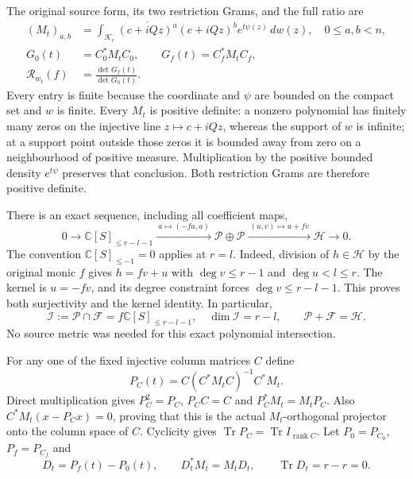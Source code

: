 The original source form, its two restriction Grams, and the full ratio are
\[
 \begin{split}
 (M_t)_{a,b}&=\int_{\mathcal K_\epsilon}
        \overline{(c+iQz)^a}(c+iQz)^b e^{t\psi(z)}\,dw(z),\quad 0\leq a,b<n,\\
 G_0(t)&=C_0^*M_tC_0,\qquad G_f(t)=C_f^*M_tC_f,\\
 \mathcal R_{w_t}(f)&=\frac{\det G_f(t)}{\det G_0(t)}.
 \end{split}
 \tag{CTR3}
\]
Every entry is finite because the coordinate and $\psi$ are bounded on
the compact set and $w$ is finite. Every $M_t$ is positive definite:
a nonzero polynomial has finitely many zeros on the injective line
$z\mapsto c+iQz$, whereas the support of $w$ is infinite; at a support
point outside those zeros it is bounded away from zero on a neighbourhood
of positive measure. Multiplication by the positive bounded density
$e^{t\psi}$ preserves that conclusion. Both restriction Grams are
therefore positive definite.

There is an exact sequence, including all coefficient maps,
\[
 0\longrightarrow\mathbb C[S]_{\leq r-l-1}
 \xrightarrow{\ a\mapsto(-fa,a)\ }
 \mathcal P\oplus\mathcal P
 \xrightarrow{\ (u,v)\mapsto u+fv\ }
 \mathcal H\longrightarrow0.
 \tag{CTR4}
\]
The convention $\mathbb C[S]_{\leq-1}=0$ applies at $r=l$.
Indeed, division of $h\in\mathcal H$ by the original monic $f$ gives
$h=fv+u$ with $\deg v\leq r-1$ and $\deg u<l\leq r$. The kernel is
$u=-fv$, and its degree constraint forces $\deg v\leq r-l-1$.
This proves both surjectivity and the kernel identity. In particular,
\[
 \mathcal I:=\mathcal P\cap\mathcal F
       =f\mathbb C[S]_{\leq r-l-1},\quad
 \dim\mathcal I=r-l,\qquad \mathcal P+\mathcal F=\mathcal H.
 \tag{CTR5}
\]
No source metric was needed for this exact polynomial intersection.

For any one of the fixed injective column matrices $C$ define
\[
 P_C(t)=C(C^*M_tC)^{-1}C^*M_t.
 \tag{CTR6}
\]
Direct multiplication gives $P_C^2=P_C$, $P_CC=C$ and
$P_C^*M_t=M_tP_C$. Also $C^*M_t(x-P_Cx)=0$, proving that this is the
actual $M_t$-orthogonal projector onto the column space of $C$.
Cyclicity gives $\operatorname{Tr}P_C=\operatorname{Tr}I_{\operatorname{rank}C}$.
Let $P_0=P_{C_0}$, $P_f=P_{C_f}$ and
\[
 D_t=P_f(t)-P_0(t),\qquad
 D_t^*M_t=M_tD_t,\qquad \operatorname{Tr}D_t=r-r=0.
 \tag{CTR7}
\]

